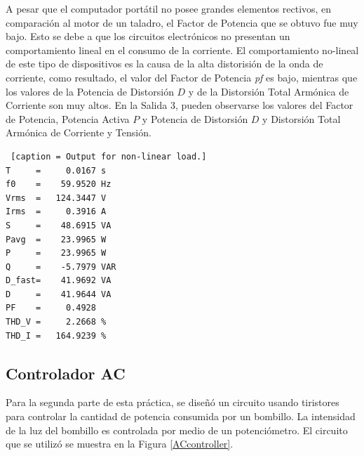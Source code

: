 \documentclass[journal]{IEEEtran}
\begin{document}
A pesar que el computador portátil no posee grandes 
elementos rectivos, en comparación al motor de un taladro, 
el Factor de Potencia que se obtuvo fue muy bajo. 
Esto se debe a que los circuitos electrónicos no presentan
un comportamiento lineal en el consumo de la corriente.
El comportamiento no-lineal de este tipo de dispositivos 
es la causa de la alta distorisión de la onda de corriente, 
como resultado, el valor del Factor de Potencia \textit{pf}
es bajo, mientras que los valores de la 
Potencia de Distorsión $D$ y de
la Distorsión Total Armónica de Corriente son muy altos. 
En la Salida 3, pueden observarse los valores del Factor 
de Potencia, Potencia Activa $P$ y Potencia de 
Distorsión $D$ y Distorsión Total Armónica de Corriente 
y Tensión. 

\begin{lstlisting} [caption = Output for non-linear load.]
T     =     0.0167 s 
f0    =    59.9520 Hz 
Vrms  =   124.3447 V
Irms  =     0.3916 A
S     =    48.6915 VA
Pavg  =    23.9965 W 
P     =    23.9965 W 
Q     =    -5.7979 VAR 
D_fast=    41.9692 VA 
D     =    41.9644 VA 
PF    =     0.4928 
THD_V =     2.2668 %
THD_I =   164.9239 %
\end{lstlisting}

\subsection{Controlador AC}

Para la segunda parte de esta práctica, se diseñó un 
circuito usando tiristores para controlar la cantidad 
de potencia consumida por un bombillo. La intensidad 
de la luz del bombillo es controlada por medio de un 
potenciómetro. El circuito que se utilizó se muestra 
en la Figura \ref{ACcontroller}. 

\end{document}
